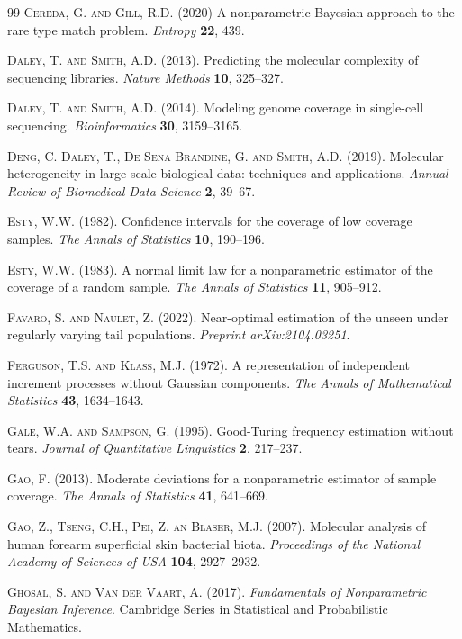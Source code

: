\documentclass{article}
\newcommand{\1}{\boldsymbol{1}}
\theoremstyle{plain}
\begin{document}
\begin{thebibliography}{99}
\textsc{Cereda, G. and Gill, R.D.} (2020) A nonparametric Bayesian approach to the rare type match problem. \textit{Entropy} \textbf{22}, 439.

\textsc{Daley, T. and Smith, A.D.} (2013). Predicting the molecular complexity of sequencing libraries. \textit{Nature Methods} \textbf{10}, 325--327.

\textsc{Daley, T. and Smith, A.D.} (2014). Modeling genome coverage in single-cell sequencing. \textit{Bioinformatics} \textbf{30}, 3159--3165.

\textsc{Deng, C. Daley, T., De Sena Brandine, G. and Smith, A.D.} (2019). Molecular heterogeneity in large-scale biological data: techniques and applications. \textit{Annual Review of Biomedical Data Science} \textbf{2}, 39--67.

\textsc{Esty, W.W.} (1982). Confidence intervals for the coverage of low coverage samples. \textit{The Annals of Statistics} \textbf{10}, 190--196.

\textsc{Esty, W.W.} (1983). A normal limit law for a nonparametric estimator of the coverage of a random sample. \textit{The Annals of Statistics} \textbf{11}, 905--912.

\textsc{Favaro, S. and Naulet, Z.} (2022). Near-optimal estimation of the unseen under regularly varying tail populations. \textit{Preprint arXiv:2104.03251}.

\textsc{Ferguson, T.S. and Klass, M.J.} (1972). A representation of independent increment processes without Gaussian components. \textit{The Annals of Mathematical Statistics} \textbf{43}, 1634--1643.

\textsc{Gale, W.A. and Sampson, G.} (1995). Good-Turing frequency estimation without tears. \textit{Journal of Quantitative Linguistics} \textbf{2}, 217--237.

\textsc{Gao, F.} (2013). Moderate deviations for a nonparametric estimator of sample coverage. \textit{The Annals of Statistics} \textbf{41}, 641--669. 

\textsc{Gao, Z., Tseng, C.H., Pei, Z. an Blaser, M.J.} (2007). Molecular analysis of human forearm superficial skin bacterial biota. \textit{Proceedings of the National Academy of Sciences of USA} \textbf{104}, 2927--2932.

\textsc{Ghosal, S. and Van der Vaart, A.} (2017). \textit{Fundamentals of Nonparametric Bayesian Inference}. Cambridge Series in Statistical and Probabilistic Mathematics.


\end{thebibliography}
\end{document}

